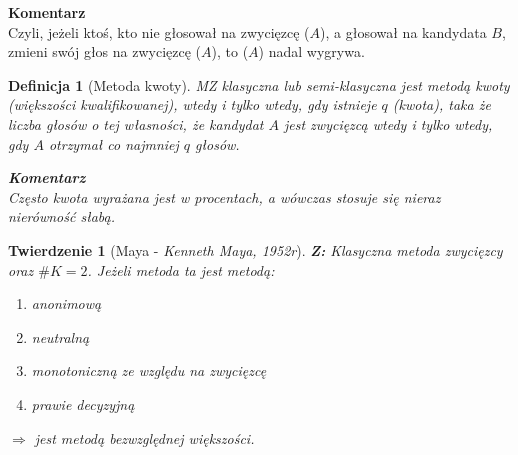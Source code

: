 \documentclass[12pt,a4paper]{article}
\theoremstyle{break}
\newcommand{\Komentarz}[1]{
	\begin{mdframed}[style=zadanie]
		\textbf{Komentarz}\\
		#1
	\end{mdframed}
	}
\newtheorem{definition}{Definicja}[section]
\newtheorem{theorem}{Twierdzenie}[section]
\begin{document}
	\Komentarz{Czyli, jeżeli ktoś, kto nie głosował na zwycięzcę ($A$), a głosował na kandydata $B$, zmieni swój głos na zwycięzcę ($A$), to ($A$) nadal wygrywa.}
	
	\begin{definition}[Metoda kwoty]
		MZ klasyczna lub semi-klasyczna jest metodą kwoty (większości kwalifikowanej), \textit{wtedy i tylko wtedy}, gdy istnieje $q$ (kwota), taka że liczba głosów o tej własności, że kandydat $A$ jest zwycięzcą \textit{wtedy i tylko wtedy}, gdy $A$ otrzymał co najmniej $q$ głosów.
		
		\Komentarz{Często kwota wyrażana jest w procentach, a wówczas stosuje się nieraz nierówność słabą.}
	\end{definition}
	\begin{theorem}[Maya - \textit{Kenneth Maya, 1952r}]
		\textbf{Z:} Klasyczna metoda zwycięzcy oraz $\# K = 2$. Jeżeli metoda ta jest metodą:
		\begin{enumerate}[(1)]
			\item anonimową
			\item neutralną
			\item monotoniczną ze względu na zwycięzcę
			\item prawie decyzyjną
		\end{enumerate}
		$\Rightarrow$ jest metodą bezwzględnej większości.
	\end{theorem}
	
\end{document}
